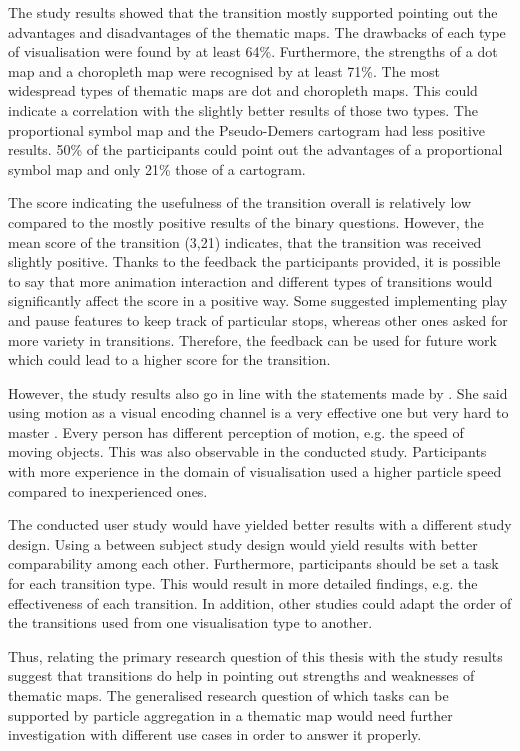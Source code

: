 \cbstart
The study results showed that the transition mostly supported pointing out the advantages and disadvantages of the thematic maps. The drawbacks of each type of visualisation were found by at least 64\%. Furthermore, the strengths of a dot map and a choropleth map were recognised by at least 71\%. The most widespread types of thematic maps are dot and choropleth maps. This could indicate a correlation with the slightly better results of those two types. The proportional symbol map and the Pseudo-Demers cartogram had less positive results. 50\% of the participants could point out the advantages of a proportional symbol map and only 21\% those of a cartogram.
\cbend

The score indicating the usefulness of the transition overall is relatively low compared to the mostly positive results of the binary questions. However, the mean score of the transition (3,21) indicates, that the transition was received slightly positive. Thanks to the feedback the participants provided, it is possible to say that more animation interaction and different types of transitions would significantly affect the score in a positive way. Some suggested implementing play and pause features to keep track of particular stops, whereas other ones asked for more variety in transitions. Therefore, the feedback can be used for future work which could lead to a higher score for the transition.

However, the study results also go in line with the statements made by \citeauthor{Munzner2014}. She said using motion as a visual encoding channel is a very effective one but very hard to master . Every person has different perception of motion, e.g. the speed of moving objects. This was also observable in the conducted study. Participants with more experience in the domain of visualisation used a higher particle speed compared to inexperienced ones.

\cbstart
The conducted user study would have yielded better results with a different study design. Using a between subject study design would yield results with better comparability among each other. Furthermore, participants should be set a task for each transition type. This would result in more detailed findings, e.g. the effectiveness of each transition. In addition, other studies could adapt the order of the transitions used from one visualisation type to another.
\cbend

Thus, relating the primary research question of this thesis with the study results suggest that transitions do help in pointing out strengths and weaknesses of thematic maps. The generalised research question of which tasks can be supported by particle aggregation in a thematic map would need further investigation with different use cases in order to answer it properly.